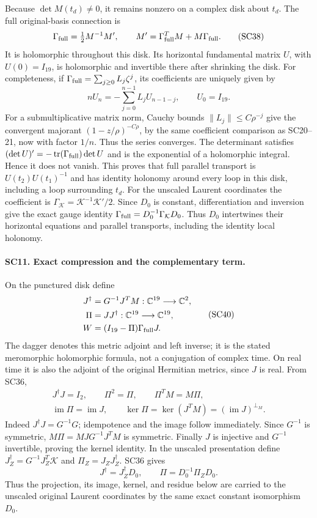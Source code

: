 \documentclass[11pt,a4paper]{article}
\theoremstyle{definition}\newtheorem{definition}[theorem]{Definition}
\begin{document}
Because \(\det M(t_d)\ne0\), it remains nonzero on a complex
disk about \(t_d\). The full original-basis connection is
\[
 \Gamma_{\rm full}=\tfrac12M^{-1}M',\qquad
 M'=\Gamma_{\rm full}^TM+M\Gamma_{\rm full}.
 \tag{SC38}
\]
It is holomorphic throughout this disk. Its horizontal
fundamental matrix \(U\), with \(U(0)=I_{19}\), is holomorphic
and invertible there after shrinking the disk. For completeness,
if \(\Gamma_{\rm full}=\sum_{j\ge0}L_j\zeta^j\), its
coefficients are uniquely given by
\[
 nU_n=-\sum_{j=0}^{n-1}L_jU_{n-1-j},\qquad U_0=I_{19}.
 \tag{SC39}
\]
For a submultiplicative matrix norm, Cauchy bounds
\(\|L_j\|\le C\rho^{-j}\) give the convergent majorant
\((1-z/\rho)^{-C\rho}\), by the same coefficient comparison
as SC20--21, now with factor \(1/n\). Thus the series converges.
The determinant satisfies
\((\det U)'=-\operatorname{tr}(\Gamma_{\rm full})\det U\)
and is the exponential of a holomorphic integral. Hence it
does not vanish. This proves that full parallel transport is
\(U(t_2)U(t_1)^{-1}\) and has identity holonomy around every
loop in this disk, including a loop surrounding \(t_d\).
For the unscaled Laurent coordinates the coefficient is
\(\Gamma_{\mathcal K}=\mathcal K^{-1}\mathcal K'/2\).
Since \(D_0\) is constant, differentiation and inversion give
the exact gauge identity
\(\Gamma_{\rm full}=D_0^{-1}\Gamma_{\mathcal K}D_0\).
Thus \(D_0\) intertwines their horizontal equations and
parallel transports, including the identity local holonomy.

\paragraph{SC11. Exact compression and the complementary term.}
On the punctured disk define
\[
 \begin{split}
 J^\dagger&=G^{-1}J^TM:\mathbb C^{19}\longrightarrow\mathbb C^2,\\
 \Pi&=JJ^\dagger:\mathbb C^{19}\longrightarrow\mathbb C^{19},\\
 W&=(I_{19}-\Pi)\Gamma_{\rm full}J .
 \end{split}\tag{SC40}
\]
The dagger denotes this metric adjoint and left inverse; it
is the stated meromorphic holomorphic formula, not a
conjugation of complex time. On real time it is also the
adjoint of the original Hermitian metrics, since \(J\) is
real. From SC36,
\[
 \begin{gathered}
 J^\dagger J=I_2,\qquad \Pi^2=\Pi,\qquad
 \Pi^TM=M\Pi,\\
 \operatorname{im}\Pi=\operatorname{im}J,\qquad
 \ker\Pi=\ker(J^TM)=(\operatorname{im}J)^{\perp_M}.
 \end{gathered}\tag{SC41}
\]
Indeed \(J^\dagger J=G^{-1}G\); idempotence and the image
follow immediately. Since \(G^{-1}\) is symmetric,
\(M\Pi=MJG^{-1}J^TM\) is symmetric. Finally \(J\) is
injective and \(G^{-1}\) invertible, proving the kernel
identity.
In the unscaled presentation define
\(J_Z^\dagger=G^{-1}J_Z^T\mathcal K\) and
\(\Pi_Z=J_ZJ_Z^\dagger\). SC36 gives
\[
 J^\dagger=J_Z^\dagger D_0,\qquad
 \Pi=D_0^{-1}\Pi_ZD_0 .
\]
Thus the projection, its image, kernel, and residue below
are carried to the unscaled original Laurent coordinates
by the same exact constant isomorphism \(D_0\).
\end{document}
